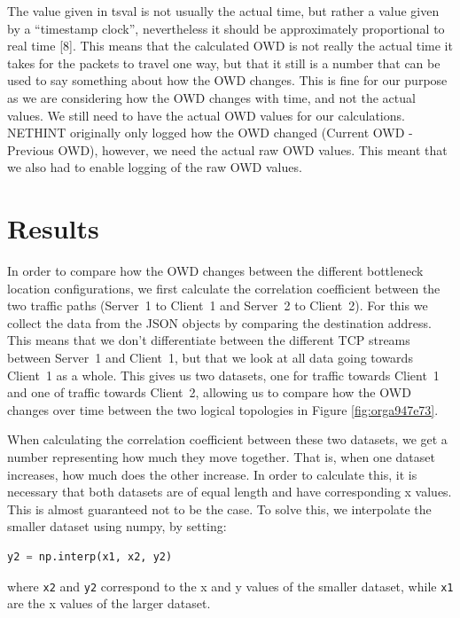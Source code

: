 \documentclass[a4paper,11pt]{article}
\makeatletter
\newcommand{\cslcitation}[2]
 {\protect\hyper@linkstart{cite}{citeproc_bib_item_#1}#2\hyper@linkend}
\makeatother
\begin{document}
The value given in tsval is not usually the actual time, but rather a value given by a ``timestamp clock'', nevertheless it should be approximately proportional to real time \cslcitation{8}{[8]}. This means that the calculated OWD is not really the actual time it takes for the packets to travel one way, but that it still is a number that can be used to say something about how the OWD changes. This is fine for our purpose as we are considering how the OWD changes with time, and not the actual values. We still need to have the actual OWD values for our calculations. NETHINT originally only logged how the OWD changed (Current OWD - Previous OWD), however, we need the actual raw OWD values. This meant that we also had to enable logging of the raw OWD values.
\section{Results}
\label{sec:org7201ed4}
In order to compare how the OWD changes between the different bottleneck location configurations, we first calculate the correlation coefficient between the two traffic paths (Server~1 to Client~1 and Server~2 to Client~2). For this we collect the data from the JSON objects by comparing the destination address. This means that we don't differentiate between the different TCP streams between Server~1 and Client~1, but that we look at all data going towards Client~1 as a whole. This gives us two datasets, one for traffic towards Client~1 and one of traffic towards Client~2, allowing us to compare how the OWD changes over time between the two logical topologies in Figure \ref{fig:orga947e73}.

When calculating the correlation coefficient between these two datasets, we get a number representing how much they move together. That is, when one dataset increases, how much does the other increase. In order to calculate this, it is necessary that both datasets are of equal length and have corresponding x values. This is almost guaranteed not to be the case. To solve this, we interpolate the smaller dataset using numpy, by setting:
\begin{lstlisting}[basicstyle=\ttfamily\footnotesize,breaklines=true,showstringspaces=false,postbreak=\mbox{$\hookrightarrow$\space},tabsize=2,language=Python,numbers=none]
y2 = np.interp(x1, x2, y2)
\end{lstlisting}
where \texttt{x2} and \texttt{y2} correspond to the x and y values of the smaller dataset, while \texttt{x1} are the x values of the larger dataset.
\end{document}
